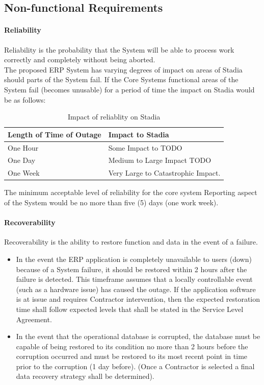 \subsection{Non-functional Requirements}

\paragraph{Reliability}
Reliability is the probability that the System will be able to process work correctly and completely without being aborted.
\\
The proposed ERP System has varying degrees of impact on areas of Stadia should parts of the System fail.
If the Core Systems functional areas of the System fail (becomes unusable) for a period of time the impact on Stadia would be as follows:

\begin{center}
\begin{table}[!hb]
\begin{tabular}{ | m{10em} | m{25em}| } 
  \hline
  \textbf{Length of Time of Outage} & \textbf{Impact to Stadia} \\ 
  \hline
   One Hour & Some Impact to {{TODO}} \\ 
   \hline
   One Day & Medium to Large Impact {{TODO}} \\
   \hline
   One Week & Very Large to Catastrophic Impact. \\
  \hline
\end{tabular}
\caption{Impact of reliablity on Stadia}
\end{table}
\end{center}

The minimum acceptable level of reliability for the core system Reporting aspect of the System would be no more than five (5) days (one work week).

\paragraph{Recoverability}
Recoverability is the ability to restore function and data in the event of a failure.

\begin{itemize}
	\item In the event the ERP application is completely unavailable to users (down) because of a System failure, it should be restored within 2 hours after the failure is detected.  This timeframe assumes that a locally controllable event (such as a hardware issue) has caused the outage.  If the application software is at issue and requires Contractor intervention, then the expected restoration time shall follow expected levels that shall be stated in the Service Level Agreement. 
	\item In the event that the operational database is corrupted, the database must be capable of being restored to its condition no more than 2 hours before the corruption occurred and must be restored to its most recent point in time prior to the corruption (1 day before). (Once a Contractor is selected a final data recovery strategy shall be determined).
\end{itemize}

